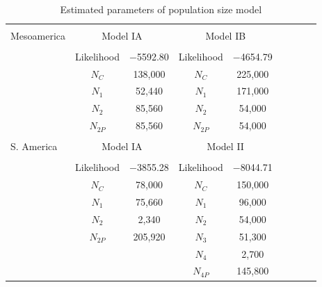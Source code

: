 \renewcommand{\arraystretch}{1.1}
\begin{table}[tb]

\begin{center}
 \caption[]{Estimated parameters of population size model}
  \textbf{}\\[-2mm]
{\fontsize{7}{11}\sf
    \begin{tabular}{lcccccccl} \hline
       & & \\[-3mm]
     Mesoamerica  & \multicolumn{2}{c}{Model IA}  &\multicolumn{2}{c}{Model IB}\\[0.1cm]
    \hline
    & & \\[-3mm]
   & Likelihood   & $-$5592.80 & Likelihood       &  $-$4654.79 \\
   &$N_C$      &  138,000             & $N_C$        & 225,000 \\
   &$N_1$        & 52,440             & $N_1$          & 171,000\\ 
   &$N_2$        & 85,560             & $N_2$          & 54,000\\    
   &$N_{2P}$   & 85,560                   &  $N_{2P}$   & 54,000\\ 
      \hline
    & & \\[-3mm]
    S. America  & \multicolumn{2}{c}{Model IA}  &\multicolumn{2}{c}{Model II}\\[0.1cm]
        \hline
     & & \\[-3mm]
      & Likelihood   &  $-$3855.28 & Likelihood     &  $-$8044.71 \\
      &$N_C$      & 78,000              & $N_C$       & 150,000 \\
      &$N_1$        & 75,660             & $N_1$      & 96,000\\ 
      &$N_2$        & 2,340               & $N_2$      & 54,000\\      
      &$N_{2P}$   & 205,920        &  $N_3$     & 51,300\\
      &                   &                         &  $N_4$     & 2,700\\      
      &                    &                     &  $N_{4P}$    & 145,800\\ [1mm]
    \hline
    \end{tabular}
    \label{param}  %
}
\end{center}
\end{table}
\renewcommand{\arraystretch}{1}


